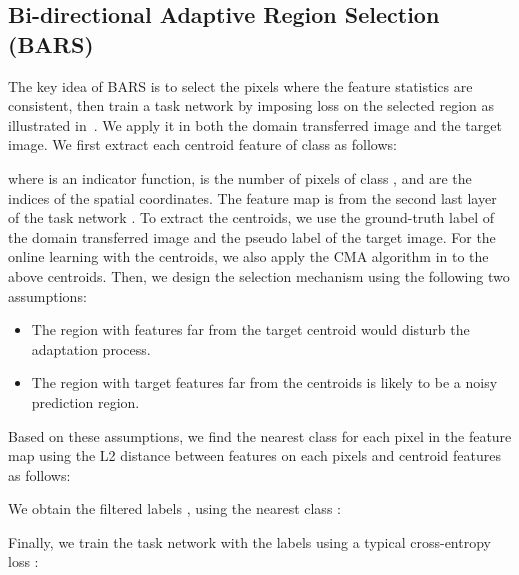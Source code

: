 \subsection{Bi-directional Adaptive Region Selection (BARS)}
\label{sec:BARS}

The key idea of BARS is to select the pixels where the feature statistics are consistent, then train a task network  by imposing loss on the selected region as illustrated in~.
We apply it in both the domain transferred image and the target image.
We first extract each centroid feature  of class  as follows:

where  is an indicator function,  is the number of pixels of class , and  are the indices of the spatial coordinates.
The feature map  is from the second last layer of the task network .
To extract the centroids, we use the ground-truth label  of the domain transferred image and the pseudo label  of the target image.
For the online learning with the centroids, we also apply the CMA algorithm in  to the above centroids.
Then, we design the selection mechanism using the following two assumptions:
\begin{itemize}
\item The region with features  far from the target centroid  would disturb the adaptation process.
\item The region with target features  far from the centroids  is likely to be a noisy prediction region.
\end{itemize}
Based on these assumptions, we find the nearest class  for each pixel in the feature map using the L2 distance between features on each pixels and centroid features as follows:

We obtain the filtered labels ,  using the nearest class :

Finally, we train the task network  with the labels using a typical cross-entropy loss :
\setlength{}


